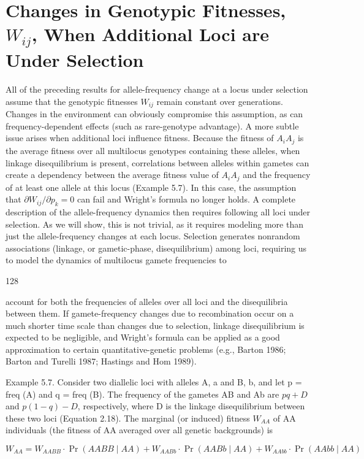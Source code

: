\documentclass{article}
\begin{document}
\section{Changes in Genotypic Fitnesses,  $ W_{ij} $, When Additional Loci are Under Selection}
All of the preceding results for allele-frequency change at a locus under selection assume that the genotypic fitnesses  $ W_{ij} $ remain constant over generations. Changes in the environment can obviously compromise this assumption, as can frequency-dependent effects (such as rare-genotype advantage). A more subtle issue arises when additional loci influence fitness. Because the fitness of  $ A_i A_j $ is the average fitness over all multilocus genotypes containing these alleles, when linkage disequilibrium is present, correlations between alleles within gametes can create a dependency between the average fitness value of  $ A_i A_j $ and the frequency of at least one allele at this locus (Example 5.7). In this case, the assumption that  $ \partial W_{ij} / \partial p_k = 0 $ can fail and Wright's formula no longer holds. A complete description of the allele-frequency dynamics then requires following all loci under selection. As we will show, this is not trivial, as it requires modeling more than just the allele-frequency changes at each locus. Selection generates nonrandom associations (linkage, or gametic-phase, disequilibrium) among loci, requiring us to model the dynamics of multilocus gamete frequencies to

128

account for both the frequencies of alleles over all loci and the disequilibria between them. If gamete-frequency changes due to recombination occur on a much shorter time scale than changes due to selection, linkage disequilibrium is expected to be negligible, and Wright's formula can be applied as a good approximation to certain quantitative-genetic problems (e.g., Barton 1986; Barton and Turelli 1987; Hastings and Hom 1989).

Example 5.7. Consider two diallelic loci with alleles A, a and B, b, and let p = freq (A) and q = freq (B). The frequency of the gametes AB and Ab are  $ pq + D $ and  $ p(1 - q) - D $, respectively, where D is the linkage disequilibrium between these two loci (Equation 2.18). The marginal (or induced) fitness  $ W_{AA} $ of AA individuals (the fitness of AA averaged over all genetic backgrounds) is

\begin{equation}
W_{A A}=W_{A A B B}\cdot\Pr(A A B B\mid A A)+W_{A A B b}\cdot\Pr(A A B b\mid A A)+W_{A A b b}\cdot\Pr(A A b b\mid A A)
\end{equation}
\end{document}
